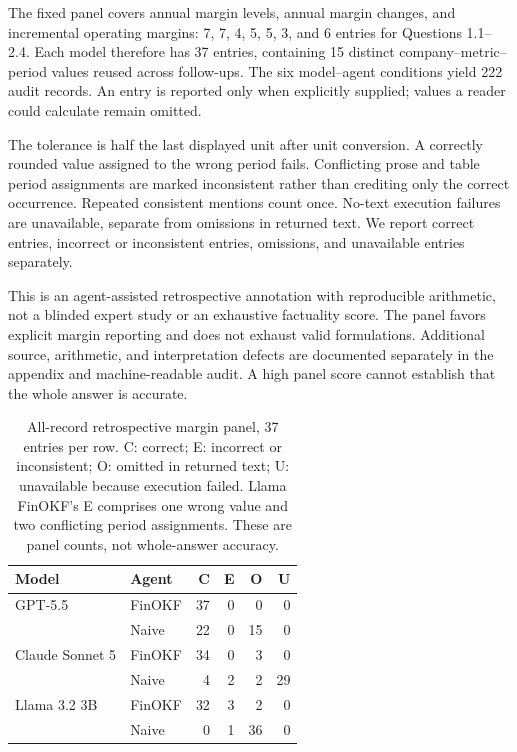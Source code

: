\documentclass[letterpaper]{article} %
\begin{document}
The fixed panel covers annual margin levels, annual margin changes, and incremental operating margins: 7, 7, 4, 5, 5, 3, and 6 entries for Questions 1.1--2.4. Each model therefore has 37 entries, containing 15 distinct company--metric--period values reused across follow-ups. The six model--agent conditions yield 222 audit records. An entry is reported only when explicitly supplied; values a reader could calculate remain omitted.

The tolerance is half the last displayed unit after unit conversion. A correctly rounded value assigned to the wrong period fails. Conflicting prose and table period assignments are marked inconsistent rather than crediting only the correct occurrence. Repeated consistent mentions count once. No-text execution failures are unavailable, separate from omissions in returned text. We report correct entries, incorrect or inconsistent entries, omissions, and unavailable entries separately.

This is an agent-assisted retrospective annotation with reproducible arithmetic, not a blinded expert study or an exhaustive factuality score. The panel favors explicit margin reporting and does not exhaust valid formulations. Additional source, arithmetic, and interpretation defects are documented separately in the appendix and machine-readable audit. A high panel score cannot establish that the whole answer is accurate.

\begin{table}[t]
\centering
\begin{tabular}{llrrrr}
\toprule
Model & Agent & C & E & O & U\\
\midrule
GPT-5.5 & FinOKF & 37 & 0 & 0 & 0\\
 & Naive & 22 & 0 & 15 & 0\\
Claude Sonnet 5 & FinOKF & 34 & 0 & 3 & 0\\
 & Naive & 4 & 2 & 2 & 29\\
Llama 3.2 3B & FinOKF & 32 & 3 & 2 & 0\\
 & Naive & 0 & 1 & 36 & 0\\
\bottomrule
\end{tabular}
\caption{All-record retrospective margin panel, 37 entries per row. C: correct; E: incorrect or inconsistent; O: omitted in returned text; U: unavailable because execution failed. Llama FinOKF's E comprises one wrong value and two conflicting period assignments. These are panel counts, not whole-answer accuracy.}
\label{tab:accuracy}
\end{table}
\end{document}
